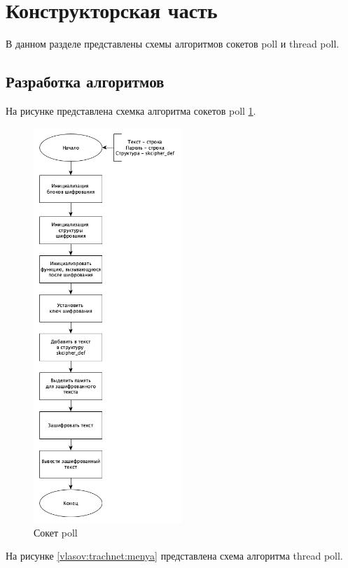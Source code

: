 \section{\large Конструкторская часть}

В данном разделе представлены схемы алгоритмов сокетов poll и thread poll.

\subsection{Разработка алгоритмов}

На рисунке представлена схемка алгоритма сокетов poll \ref{vlasov:naydet:menya}.

\begin{figure}[ht!]
	\centering
		\includegraphics[width=0.5\textwidth]{assets/graphs/cipher.png}
		\caption{Сокет poll}
		\label{vlasov:naydet:menya}
\end{figure}

На рисунке \ref{vlasov:trachnet:menya} представлена схема алгоритма thread poll.

